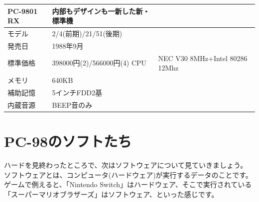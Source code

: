 \documentclass[b5paper,9pt,platex,dvipdfmx]{jsarticle}
\begin{document}
\begin{multicols}{3}
\begin{table}[H]
  \centering
    \begin{tabular}{ll}
        {\bf PC-9801 RX} & 内部もデザインも一新した新・標準機\\ \hline
        モデル & 2/4(前期)/21/51(後期)\\
        発売日 & 1988年9月\\
        標準価格 & 398000円(2)/566000円(4)
        CPU & NEC V30 8MHz+Intel 80286 12Mhz\\
        メモリ & 640KB\\
        補助記憶 & 5インチFDD2基\\
        内蔵音源 & BEEP音のみ\\
        \end{tabular}
\end{table}

\part{PC-98のソフトたち}
\setcounter{section}{0}
ハードを見終わったところで、次はソフトウェアについて見ていきましょう。\\
ソフトウェアとは、コンピュータ(ハードウェア)が実行するデータのことです。\\
ゲームで例えると、「Nintendo Switch」はハードウェア、そこで実行されている「スーパーマリオブラザーズ」はソフトウェア、といった感じです。

\end{multicols}
\end{document}
